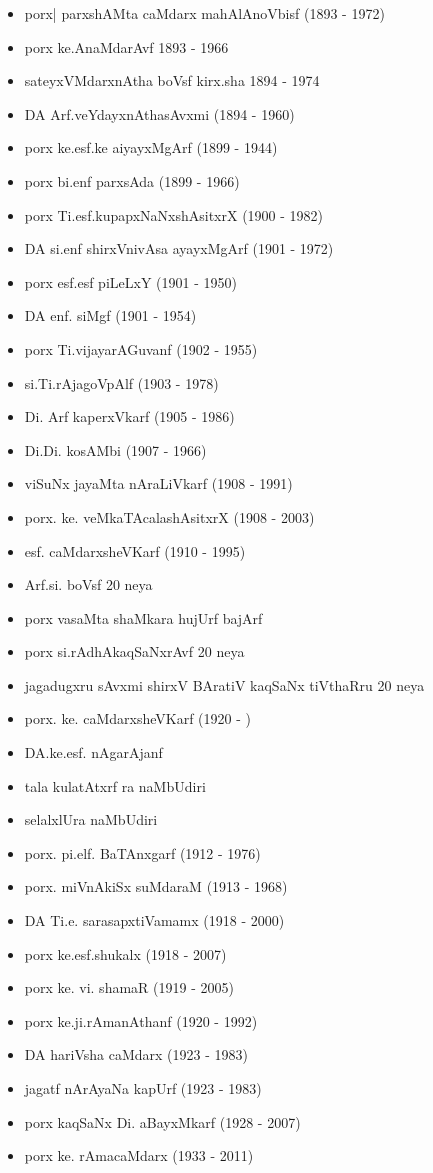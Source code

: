 {\begin{itemize}
\item porx| parxshAMta caMdarx mahAlAnoVbisf {\rm (1893 - 1972)}
\item porx ke.AnaMdarAvf {\rm 1893 - 1966}
\item sateyxVMdarxnAtha boVsf kirx.sha {\rm 1894 - 1974}
\item DA Arf.veYdayxnAthasAvxmi {\rm (1894 - 1960)}
\item porx ke.esf.ke aiyayxMgArf {\rm (1899 - 1944)}
\item porx bi.enf parxsAda {\rm (1899 - 1966)}
\item porx Ti.esf.kupapxNaNxshAsitxrX {\rm (1900 - 1982)}
\item DA si.enf shirxVnivAsa ayayxMgArf {\rm (1901 - 1972)}
\item porx esf.esf piLeLxY {\rm (1901 - 1950)}
\item DA enf. siMgf {\rm (1901 - 1954)}
\item porx Ti.vijayarAGuvanf {\rm (1902 - 1955)}
\item si.Ti.rAjagoVpAlf {\rm (1903 - 1978)}
\item Di. Arf kaperxVkarf {\rm (1905 - 1986)}
\item Di.Di. kosAMbi {\rm (1907 - 1966)}
\item viSuNx jayaMta nAraLiVkarf {\rm (1908 - 1991)}
\item porx. ke. veMkaTAcalashAsitxrX {\rm (1908 - 2003)}
\item esf. caMdarxsheVKarf {\rm (1910 - 1995)}
\item Arf.si. boVsf {\rm 20} neya 
\item porx vasaMta shaMkara hujUrf bajArf
\item porx si.rAdhAkaqSaNxrAvf {\rm 20} neya
\item jagadugxru sAvxmi shirxV BAratiV kaqSaNx tiVthaRru {\rm 20} neya
\item porx. ke. caMdarxsheVKarf {\rm (1920 - )}
\item DA.ke.esf. nAgarAjanf
\item tala kulatAtxrf ra naMbUdiri
\item selalxlUra naMbUdiri
\item porx. pi.elf. BaTAnxgarf {\rm (1912 - 1976)}
\item porx. miVnAkiSx suMdaraM {\rm (1913 - 1968)}
\item DA Ti.e. sarasapxtiVamamx {\rm (1918 - 2000)}
\item porx ke.esf.shukalx {\rm (1918 - 2007)}
\item porx ke. vi.  shamaR {\rm (1919 - 2005)}
\item porx ke.ji.rAmanAthanf {\rm (1920 - 1992)}
\item DA hariVsha caMdarx {\rm (1923 - 1983)}
\item jagatf nArAyaNa kapUrf {\rm (1923 - 1983)}
\item porx kaqSaNx Di. aBayxMkarf {\rm (1928 - 2007)}
\item porx ke. rAmacaMdarx {\rm (1933 - 2011)}
\end{itemize}}

